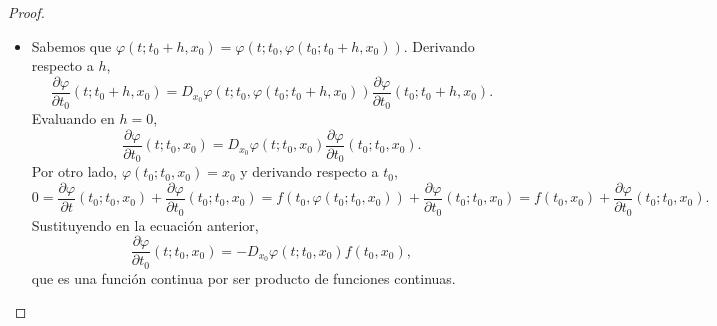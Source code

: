 \begin{proof}
\begin{itemize}
\item Sabemos que $\displaystyle \varphi\left(t; t_{0} + h, x_{0}\right)=\varphi\left(t; t_{0}, \varphi\left(t_{0}; t_{0} + h, x_{0}\right)\right) $. Derivando respecto a $\displaystyle h $,
\[\frac{\partial\varphi}{\partial t_{0}}\left(t; t_{0} + h, x_{0}\right) = D_{x_{0}}\varphi\left(t; t_{0}, \varphi\left(t_{0}; t_{0} + h, x_{0}\right)\right)\frac{\partial \varphi}{\partial t_{0}}\left(t_{0}; t_{0} + h, x_{0}\right) .\]
Evaluando en $\displaystyle h = 0 $, 
\[\frac{\partial \varphi}{\partial t_{0}}\left(t; t_{0}, x_{0}\right)=D_{x_{0}}\varphi\left(t; t_{0}, x_{0}\right)\frac{\partial \varphi}{\partial t_{0}}\left(t_{0}; t_{0}, x_{0}\right) .\]
Por otro lado, $\displaystyle \varphi\left(t_{0}; t_{0}, x_{0}\right)=x_{0} $ y derivando respecto a $\displaystyle t_{0} $,
\[0 = \frac{\partial \varphi}{\partial t}\left(t_{0}; t_{0}, x_{0}\right) + \frac{\partial \varphi}{\partial t_{0}}\left(t_{0}; t_{0}, x_{0}\right)=f\left(t_{0}, \varphi\left(t_{0}; t_{0}, x_{0}\right)\right) + \frac{\partial \varphi}{\partial t_{0}}\left(t_{0}; t_{0}, x_{0}\right)=f\left(t_{0}, x_{0}\right) + \frac{\partial \varphi}{\partial t_{0}}\left(t_{0}; t_{0}, x_{0}\right).\]
Sustituyendo en la ecuación anterior,
\[\frac{\partial \varphi}{\partial t_{0}}\left(t; t_{0}, x_{0}\right)=-D_{x_{0}}\varphi\left(t; t_{0}, x_{0}\right)f\left(t_{0}, x_{0}\right) ,\]
que es una función continua por ser producto de funciones continuas. 
\end{itemize}
\end{proof}

